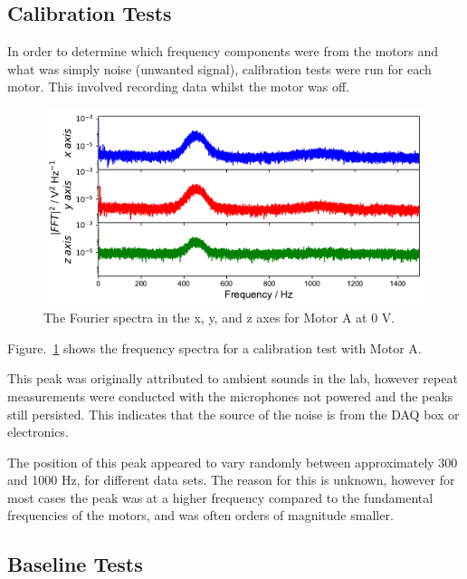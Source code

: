 \subsection{Calibration Tests}

In order to determine which frequency components were from the motors and what was simply noise (unwanted signal), calibration tests were run for each motor. This involved recording data whilst the motor was off. 

\begin{figure}[t]
    \includegraphics[width=1.0\textwidth]{fig/freq_large_0V.pdf}
    \caption[Calibration Frequency 1]{The Fourier spectra in the x, y, and z axes for Motor A at 0 V.}
    \label{fig:freq_large0V}
\end{figure}

Figure.~\ref{fig:freq_large0V} shows the frequency spectra for a calibration test with Motor A. 

This peak was originally attributed to ambient sounds in the lab, however repeat measurements were conducted with the microphones not powered and the peaks still persisted. This indicates that the source of the noise is from the DAQ box or electronics. 

The position of this peak appeared to vary randomly between approximately 300 and 1000 Hz, for different data sets. The reason for this is unknown, however for most cases the peak was at a higher frequency compared to the fundamental frequencies of the motors, and was often orders of magnitude smaller. 

\subsection{Baseline Tests}

